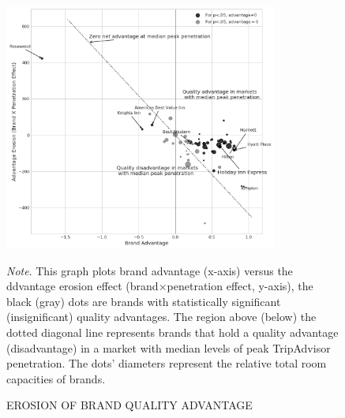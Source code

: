 \documentclass[mksc,blindrev]{informs3} %
\begin{document}
\begin{figure}[htp]
 \centering  
{\includegraphics[width=0.8\textwidth,height=\textheight,keepaspectratio]{./Figures/brand_coeff2.png} }

\begin{flushleft}
\small
\textit{Note}. This graph plots brand advantage (x-axis) versus the ddvantage erosion effect (brand$\times$penetration effect, y-axis), the black (gray) dots are brands with statistically significant (insignificant) quality advantages. The region above (below) the dotted diagonal line represents brands that hold a quality advantage (disadvantage) in a market with median levels of peak TripAdvisor penetration. The dots' diameters represent the relative total room capacities of brands.
\end{flushleft}

\caption{EROSION OF BRAND QUALITY ADVANTAGE}
\label{fig:brandvspenetrate}
\end{figure}
\clearpage



\ACKNOWLEDGMENT{%
}%


%
%
%
\end{document}
